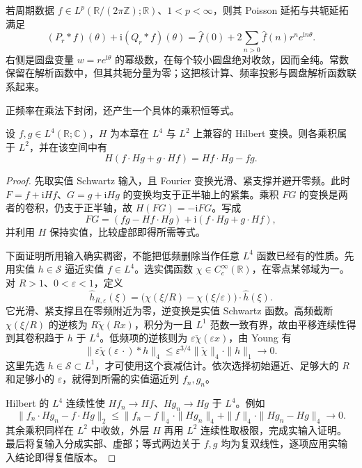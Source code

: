 若周期数据 \(f\in L^p(\mathbb R/(2\pi\mathbb Z);\mathbb R)\)、\(1<p<\infty\)，则其 Poisson 延拓与共轭延拓满足
\[
 (P_r*f)(\theta)+\mathrm i(Q_r*f)(\theta)
 =\widehat f(0)+2\sum_{n>0}\widehat f(n)r^ne^{\mathrm in\theta}.
\]
右侧是圆盘变量 \(w=re^{\mathrm i\theta}\) 的幂级数，在每个较小圆盘绝对收敛，因而全纯。常数保留在解析函数中，但其共轭分量为零；这把核计算、频率投影与圆盘解析函数联系起来。

\ProseParagraphBreak

正频率在乘法下封闭，还产生一个具体的乘积恒等式。

\begin{proposition}\label{b2:prop:18-hilbert-product}
设 \(f,g\in L^4(\mathbb R;\mathbb C)\)，\(H\) 为本章在 \(L^4\) 与 \(L^2\) 上兼容的 Hilbert 变换。则各乘积属于 \(L^2\)，并在该空间中有
\[
 H(f\cdot Hg+g\cdot Hf)=Hf\cdot Hg-fg.
\]
\end{proposition}
\begin{proof}
先取实值 Schwartz 输入，且 Fourier 变换光滑、紧支撑并避开零频。此时 \(F=f+\mathrm iHf\)、\(G=g+\mathrm iHg\) 的变换均支于正半轴上的紧集。乘积 \(FG\) 的变换是两者的卷积，仍支于正半轴，故 \(H(FG)=-\mathrm iFG\)。写成
\[
 FG=(fg-Hf\cdot Hg)+\mathrm i(f\cdot Hg+g\cdot Hf),
\]
并利用 \(H\) 保持实值，比较虚部即得所需等式。

下面证明所用输入确实稠密，不能把低频删除当作任意 \(L^4\) 函数已经有的性质。先用实值 \(h\in\mathcal S\) 逼近实值 \(f\in L^4\)。选实偶函数 \(\chi\in C_c^\infty(\mathbb R)\)，在零点某邻域为一。对 \(R>1\)、\(0<\varepsilon<1\)，定义
\[
 \widehat h_{R,\varepsilon}(\xi)
 =\bigl(\chi(\xi/R)-\chi(\xi/\varepsilon)\bigr)\cdot\widehat h(\xi).
\]
它光滑、紧支撑且在零频附近为零，逆变换是实值 Schwartz 函数。高频截断 \(\chi(\xi/R)\) 的逆核为 \(R\check\chi(Rx)\)，积分为一且 \(L^1\) 范数一致有界，故由平移连续性得到其卷积趋于 \(h\) 于 \(L^4\)。低频项的逆核则为 \(\varepsilon\check\chi(\varepsilon x)\)，由 Young 有
\[
 \|\varepsilon\check\chi(\varepsilon\,\cdot)*h\|_4
 \leq\varepsilon^{3/4}\|\check\chi\|_4\cdot\|h\|_1
 \longrightarrow0.
\]
这里先选 \(h\in\mathcal S\subset L^1\)，才可使用这个衰减估计。依次选择初始逼近、足够大的 \(R\) 和足够小的 \(\varepsilon\)，就得到所需的实值逼近列 \(f_n,g_n\)。

Hilbert 的 \(L^4\) 连续性使 \(Hf_n\rightarrow Hf\)、\(Hg_n\rightarrow Hg\) 于 \(L^4\)。例如
\[
 \|f_n\cdot Hg_n-f\cdot Hg\|_2
 \leq\|f_n-f\|_4\cdot\|Hg_n\|_4
  +\|f\|_4\cdot\|Hg_n-Hg\|_4\longrightarrow0.
\]
其余乘积同样在 \(L^2\) 中收敛，外层 \(H\) 再用 \(L^2\) 连续性取极限，完成实输入证明。最后将复输入分成实部、虚部；等式两边关于 \(f,g\) 均为复双线性，逐项应用实输入结论即得复值版本。
\end{proof}

